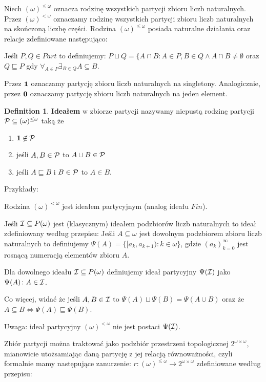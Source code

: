 \documentclass[12pt]{article}
\theoremstyle{plain}
\theoremstyle{definition}
\newtheorem{definition}[theorem]{Definition}
\theoremstyle{remark}
\newcommand{\cI}{{\cal I}}
\newcommand{\cP}{{\cal P}}
\newcommand{\Part}{(\omega)^{\leq\omega}}
\newcommand{\FinPart}{(\omega)^{<\omega}}
\begin{document}
Niech $\Part$ oznacza rodzinę wszystkich partycji zbioru liczb naturalnych.
Przez $\FinPart$ oznaczamy rodzinę wszystkich partycji
zbioru liczb naturalnych na skończoną liczbę części.
Rodzina $\Part$ posiada naturalne działania oraz relacje
zdefiniowane następująco:

Jeśli $P,Q \in Part$ to definiujemy:
$P\sqcup Q = \{A \cap B \colon A \in P, B\in Q \wedge 
A \cap B \not= \emptyset$
oraz $Q \sqsubseteq P$ gdy $\forall_{A\in P} \exists_{B\in Q} A\subseteq B$.

Przez ${\bf 1}$ oznaczamy partycję zbioru liczb naturalnych 
na singletony. Analogicznie, przez ${\bf 0}$ oznaczamy
partycję zbioru liczb naturalnych na jeden element.

\begin{definition}
{\bf Ideałem} w zbiorze partycji nazywamy niepustą rodzinę
partycji $\cP \subseteq \Part$ taką że
\begin{enumerate}
\item ${\bf 1} \not\in\cP$
\item jeśli $A,B\in \cP$ to $A\sqcup B\in \cP$
\item jeśli $A \sqsubseteq B$ i $B\in \cP$ to $A\in B$.
\end{enumerate}
\end{definition}

Przykłady:

Rodzina $\FinPart$ jest ideałem partycyjnym (analog ideału $Fin$).

Jeśli $\cI\subseteq P(\omega)$ jest (klasycznym) ideałem 
podzbiorów liczb naturalnych to ideał zdefiniowany 
według przepisu: 
Jeśli $A\subseteq\omega$ jest dowolnym podzbiorem
zbioru liczb naturalnych
to definiujemy $\Psi(A) = 
\{[a_k, a_{k+1}) \colon k\in\omega\}$, gdzie
$(a_k)_{k=0}^{\infty}$ jest rosnącą numeracją
elementów zbioru $A$.

Dla dowolnego ideału $\cI \subseteq P(\omega)$
definiujemy ideał partycyjny 
$\Psi(\cI)$ jako $\Psi(A)\colon A\in\cI$.

Co więcej, widać że jeśli $A,B\in\cI$ to
$\Psi(A)\sqcup \Psi(B) = \Psi(A \cup B)$
oraz że $A \subseteq B \iff \Psi(A) \sqsubseteq \Psi(B)$.

Uwaga: ideał partycyjny $\FinPart$ nie jest postaci
$\Psi(\cI)$.

Zbiór partycji można traktować jako podzbiór przestrzeni
topologicznej $2^{\omega\times\omega}$, mianowicie
utożsamiając daną partycję z jej relacją równoważności,
czyli formalnie mamy następujące zanurzenie:
$r\colon\Part\to 2^{\omega\times\omega}$
zdefiniowane według przepisu:
\end{document}
